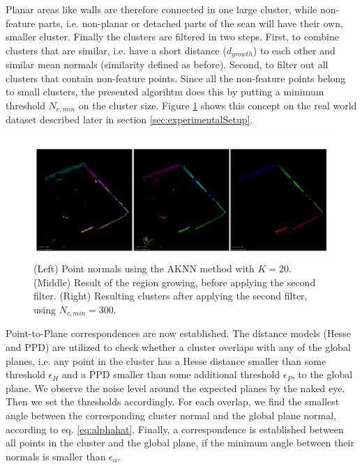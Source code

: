 Planar areas like walls are therefore connected in one large cluster, while non-feature parts, i.e. non-planar or detached parts of the scan will have their own, smaller cluster.
Finally the clusters are filtered in two steps.
First, to combine clusters that are similar, i.e. have a short distance ($d_{growth}$) to each other and similar mean normals (similarity defined as before).
Second, to filter out all clusters that contain non-feature points.
Since all the non-feature points belong to small clusters, the presented algorihtm does this by putting a minimum threshold $N_{c,min}$ on the cluster size.
Figure \ref{fig:clustering} shows this concept on the real world dataset described later in section \ref{sec:experimentalSetup}.

\begin{figure}
	\includegraphics[width=\linewidth]{images/clustering}
	\caption{(Left) Point normals using the AKNN method with $K = 20$. (Middle) Result of the region growing, before applying the second filter. (Right) Resulting clusters after applying the second filter, using $N_{c,min} = 300$. }
	\label{fig:clustering}
\end{figure}

Point-to-Plane correspondences are now established.
The distance models (Hesse and PPD) are utilized to check whether a cluster overlaps with any of the global planes, i.e. any point in the cluster has a Hesse distance smaller than some threshold $\epsilon_H$ and a PPD smaller than some additional threshold $\epsilon_P$, to the global plane.
We observe the noise level around the expected planes by the naked eye. 
Then we set the thresholds accordingly. 
For each overlap, we find the smallest angle between the corresponding cluster normal and the global plane normal, according to eq. \ref{eq:alphahat}.
Finally, a correspondence is established between all points in the cluster and the global plane, if the minimum angle between their normals is smaller than $\epsilon_\alpha$. 

